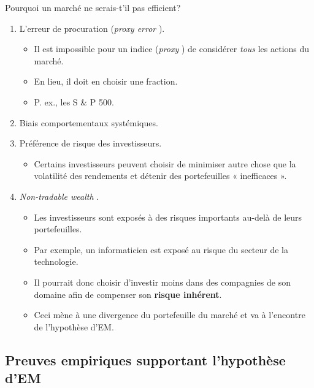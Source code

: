 \documentclass[10pt, french]{article}
\begin{document}
\begin{multicols*}{2}
\begin{conceptgen}{Pourquoi un marché ne serais-t'il pas efficient?}
\begin{enumerate}[label = \circled{\arabic*}{trueblue}]
	\item	L'erreur de procuration (\og \textit{proxy error} \fg{}).
		\begin{itemize}
		\item	Il est impossible pour un indice (\og \textit{proxy} \fg{}) de considérer \textit{tous} les actions du marché.
		\item	En lieu, il doit en choisir une fraction.
		\item	P. ex., les S \& P 500.
		\end{itemize}
	\item	Biais comportementaux systémiques.
	\item	Préférence de risque des investisseurs.
		\begin{itemize}
		\item	Certains investisseurs peuvent choisir de minimiser autre chose que la volatilité des rendements et détenir des portefeuilles « inefficaces ».
		\end{itemize}
	\item	\og \textit{Non-tradable wealth} \fg{}.
		\begin{itemize}
		\item	Les investisseurs sont exposés à des risques importants au-delà de leurs portefeuilles.
		\item	Par exemple, un informaticien est exposé au risque du secteur de la technologie. 
		\item	Il pourrait donc choisir d'investir moins dans des compagnies de son domaine afin de compenser son \textbf{risque inhérent}.
		\item	Ceci mène à une divergence du portefeuille du marché et va à l'encontre de l'hypothèse d'EM.
		\end{itemize}
\end{enumerate}
\end{conceptgen}


\pagebreak
\subsection{Preuves empiriques supportant l'hypothèse d'EM}

\end{multicols*}
\end{document}
